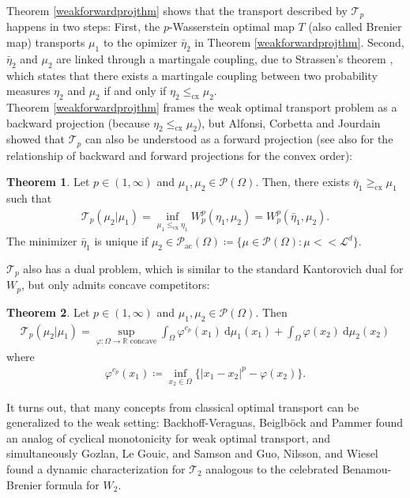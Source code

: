 \documentclass[letterpaper]{amsart}
\newcommand{\RR}{\mathbb{R}}
\newcommand{\dd}{\mathrm{d}}
\theoremstyle{definition}
\newtheorem{thm}{Theorem}[section]
\begin{document}
Theorem \ref{weakforwardprojthm} shows that the transport described by $\mathcal T_p$ happens in two steps: First, the $p$-Wasserstein optimal map $T$ (also called Brenier map) transports $\mu_1$ to the opimizer $\bar\eta_2$ in 
Theorem \ref{weakforwardprojthm}. Second, $\bar\eta_2$ and $\mu_2$ are linked through a martingale coupling, due to Strassen's theorem \cite{strassen1965}, which states that there exists a martingale coupling between two probability measures $\eta_2$ and $\mu_2$ if and only if $\eta_2\leq_{\text{cx}}\mu_2$.\\
Theorem \ref{weakforwardprojthm} frames the weak optimal transport problem as a backward projection (because $\eta_2\leq_{\text{cx}}\mu_2$), but Alfonsi, Corbetta and Jourdain \cite{alfonsi2020} showed that $\mathcal T_p$ can also be understood as a forward projection (see also \cite[Sec 8]{kim2024} for the relationship of backward and forward projections for the convex order):
\begin{thm}\cite[Thm 4.1, Cor 4.4]{alfonsi2020}\label{weakbackwardprojthm}
	Let $p\in (1,\infty)$ and $\mu_1,\mu_2\in\mathcal P(\Omega)$. Then, there exists $\bar\eta_1\geq_{\text{cx}}\mu_1$ such that
	\begin{gather*}
		\mathcal T_p(\mu_2|\mu_1)=\inf_{\mu_1\leq_{\text{cx}}\eta_1}W_p^p(\eta_1,\mu_2)=W_p^p(\bar\eta_1,\mu_2).
	\end{gather*}
	The minimizer $\bar\eta_1$ is unique if $\mu_2\in\mathcal P_{\text{ac}}(\Omega)\coloneqq\big\{\mu\in\mathcal P(\Omega):\mu<<\mathcal L^d\}$.
\end{thm}
$\mathcal T_p$ also has a dual problem, which is similar to the standard Kantorovich dual for $W_p$, but only admits concave competitors:
\begin{thm}\cite[Thm 2.11(3)]{gozlan2017}\label{weakdualitythm} Let $p\in(1,\infty)$ and $\mu_1,\mu_2\in\mathcal P(\Omega)$. Then
	\begin{gather*}
		\mathcal T_p(\mu_2|\mu_1)=\sup_{\varphi:\Omega\rightarrow\RR\text{ concave}}\int_{\Omega} \varphi^{c_p}(x_1)\ \dd\mu_1(x_1)+\int_{\Omega}\varphi(x_2)\ \dd\mu_2(x_2)
	\end{gather*}
	where
	\begin{gather*}
		\varphi^{c_p}(x_1)\coloneqq \inf_{x_2\in\Omega}\Big\{ |x_1-x_2|^p-\varphi(x_2)\Big\}.
	\end{gather*}
\end{thm}
It turns out, that many concepts from classical optimal transport can be generalized to the weak setting: Backhoff-Veraguas, Beiglb{\"o}ck and Pammer \cite{backhoff2019} found an analog of cyclical monotonicity for weak optimal transport, and simultaneously Gozlan, Le Gouic, and Samson \cite{gozlan2025} and Guo, Nilsson, and Wiesel \cite{guo2026} found a dynamic characterization for $\mathcal T_2$ analogous to the celebrated Benamou-Brenier formula \cite{benamou2000} for $W_2$.\\
\end{document}
